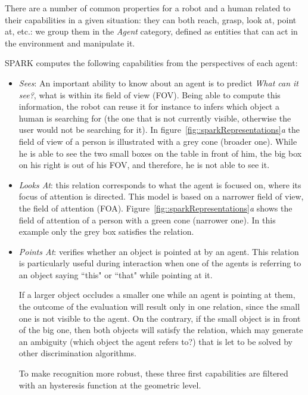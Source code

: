 There are a number of common properties for a robot and a human related to
their capabilities in a given situation: they can both reach, grasp, look at,
point at, etc.: we group them in the \emph{Agent} category, defined as entities
that can act in the environment and manipulate it.

SPARK computes the following capabilities from the perspectives of each agent:

\begin{itemize}

\item \emph{Sees}: An important ability to know about an agent is to predict
\emph{What can it see?}, \ie what is within its field of view (FOV). Being able
to compute this information, the robot can reuse it for instance to infers
which object a human is searching for (the one that is not currently visible,
otherwise the user would not be searching for it).  In
figure~\ref{fig::sparkRepresentations}\emph{a} the field of view of a person is
illustrated with a grey cone (broader one). While he is able to see the two
small boxes on the table in front of him, the big box on his right is out of
his FOV, and therefore, he is not able to see it. 

\item \emph{Looks At}: this relation corresponds to what the agent is focused
on, \ie where its focus of attention is directed. This model is based on a
narrower field of view, the field of attention (FOA). 
Figure~\ref{fig::sparkRepresentations}\emph{a}
shows the field of attention of a person with a green cone (narrower one). In
this example only the grey box satisfies the  relation.

\item \emph{Points At}: verifies whether an object is pointed at by an agent.
This relation is particularly useful during interaction when one of the agents
is referring to an object saying ``this" or ``that" while pointing at it.
 
If a larger object occludes a smaller one while an agent is pointing at them, the
outcome of the evaluation will result only in one relation, \ie {} since the small one is not visible to the agent.  On the
contrary, if the small object is in front of the big one, then both objects
will satisfy the relation, which may generate an ambiguity (which object the
agent refers to?) that is let to be solved by other discrimination algorithms.

To make recognition more robust, these three first capabilities are filtered
with an hysteresis function at the geometric level.


\end{itemize}
